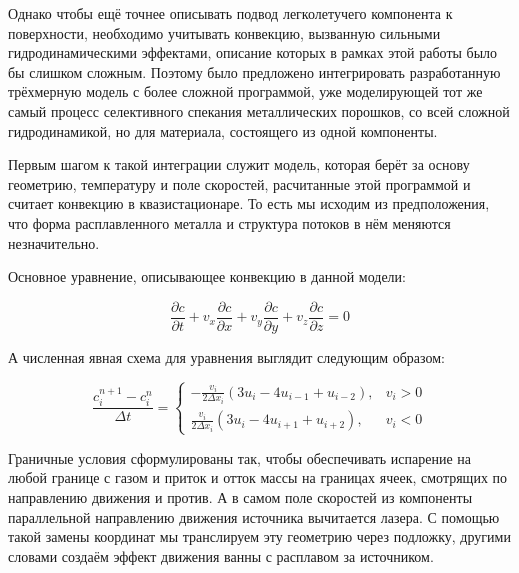 Однако чтобы ещё точнее описывать подвод легколетучего компонента к поверхности, необходимо учитывать конвекцию, вызванную сильными гидродинамическими эффектами, описание которых в рамках этой работы было бы слишком сложным. Поэтому было предложено интегрировать разработанную трёхмерную модель с более сложной программой, уже моделирующей тот же самый процесс селективного спекания металлических порошков, со всей сложной гидродинамикой, но для материала, состоящего из одной компоненты. 

Первым шагом к такой интеграции служит модель, которая берёт за основу геометрию, температуру и поле скоростей, расчитанные этой программой и считает конвекцию в квазистационаре. То есть мы исходим из предположения, что форма расплавленного металла и структура потоков в нём меняются незначительно.

Основное уравнение, описывающее конвекцию в данной модели:

\begin{equation*}
    \frac{\partial c}{\partial t} + v_x \frac{\partial c}{\partial x} + v_y \frac{\partial c}{\partial y} + v_z \frac{\partial c}{\partial z} = 0
\end{equation*}

А численная явная схема для уравнения выглядит следующим образом:

\begin{equation}
    \label{eq:sec-upwind}
    \frac{c^{n+1}_{i} - c^{n}_{i}}{\Delta t} =
    \begin{cases}
         -\frac{v_i}{2\Delta x_i}(3u_i-4u_{i-1}+u_{i-2}), &v_i > 0 \\
         \frac{v_i}{2\Delta x_i}(3u_i-4u_{i+1}+u_{i+2}), &v_i < 0 
    \end{cases}
\end{equation}

Граничные условия сформулированы так, чтобы обеспечивать испарение на любой границе с газом и приток и отток массы на границах ячеек, смотрящих по направлению движения и против. А в самом поле скоростей из компоненты параллельной направлению движения источника вычитается лазера. С помощью такой замены координат мы транслируем эту геометрию через подложку, другими словами создаём эффект движения ванны с расплавом за источником.



\clearpage